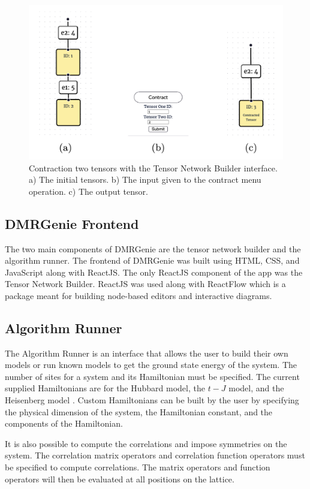 \documentclass{juliacon}
\begin{document}
\begin{figure}[b]
    \includegraphics[width=\columnwidth]{contraction.png}
\caption{Contraction two tensors with the Tensor Network Builder interface. a) The initial tensors. b) The input given to the contract menu operation. c) The output tensor. } \label{GUIcontraction}
\end{figure}

\subsection{DMRGenie Frontend}
The two main components of DMRGenie are the tensor network builder and the algorithm runner. The frontend of DMRGenie was built using HTML, CSS, and JavaScript along with ReactJS. The only ReactJS component of the app was the Tensor Network Builder. ReactJS was used along with ReactFlow which is a package meant for building node-based editors and interactive diagrams. 

\subsection{Algorithm Runner}
The Algorithm Runner is an interface that allows the user to build their own models or run known models to get the ground state energy of the system. The number of sites for a system and its Hamiltonian must be specified. The current supplied Hamiltonians are for the Hubbard model, the $t-J$ model, and the Heisenberg model \cite{fradkin2013field}. Custom Hamiltonians can be built by the user by specifying the physical dimension of the system, the Hamiltonian constant, and the components of the Hamiltonian.


It is also possible to compute the correlations and impose symmetries on the system. The correlation matrix operators and correlation function operators must be specified to compute correlations. The matrix operators and function operators will then be evaluated at all positions on the lattice. 
\end{document}
